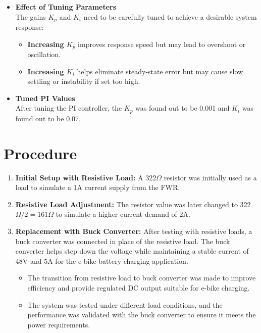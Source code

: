 \documentclass[12pt]{article}
\begin{document}
\begin{itemize}
    \item \textbf{Effect of Tuning Parameters} \\
    The gains \( K_p \) and \( K_i \) need to be carefully tuned to achieve a desirable system response:
    \begin{itemize}
        \item \textbf{Increasing \( K_p \)} improves response speed but may lead to overshoot or oscillation.
        \item \textbf{Increasing \( K_i \)} helps eliminate steady-state error but may cause slow settling or instability if set too high.
    \end{itemize}
    \item \textbf{Tuned PI Values} \\
    After tuning the PI controller, the \( K_p \) was found out to be 0.001 and \( K_i \) was found out to be 0.07.

\end{itemize}
\section*{Procedure}

\begin{enumerate}
    \item \textbf{Initial Setup with Resistive Load:} A 322$\Omega$ resistor was initially used as a load to simulate a 1A current supply from the FWR.
    \item \textbf{Resistive Load Adjustment:} The resistor value was later changed to 322$\Omega / 2 = 161\Omega$ to simulate a higher current demand of 2A.
    \item \textbf{Replacement with Buck Converter:} After testing with resistive loads, a buck converter was connected in place of the resistive load. The buck converter helps step down the voltage while maintaining a stable current of 48V and 5A for the e-bike battery charging application.
    \begin{itemize}
        \item The transition from resistive load to buck converter was made to improve efficiency and provide regulated DC output suitable for e-bike charging.
        \item The system was tested under different load conditions, and the performance was validated with the buck converter to ensure it meets the power requirements.
    \end{itemize}
\end{enumerate}
\end{document}
